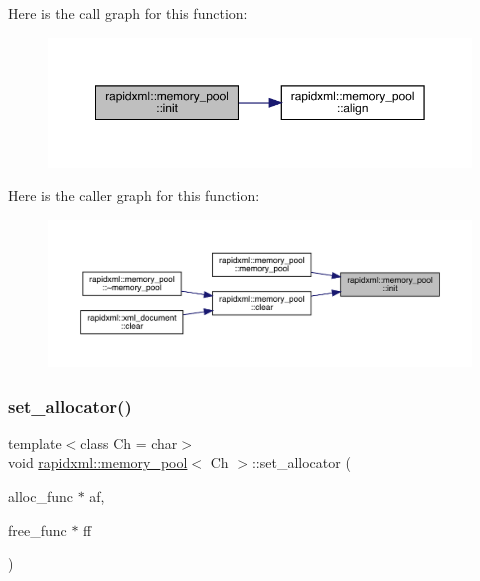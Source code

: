 Here is the call graph for this function\+:\nopagebreak
\begin{figure}[H]
\begin{center}
\leavevmode
\includegraphics[width=350pt]{classrapidxml_1_1memory__pool_a1076043ef092e327e59dd988c1ba82fb_cgraph}
\end{center}
\end{figure}
Here is the caller graph for this function\+:\nopagebreak
\begin{figure}[H]
\begin{center}
\leavevmode
\includegraphics[width=350pt]{classrapidxml_1_1memory__pool_a1076043ef092e327e59dd988c1ba82fb_icgraph}
\end{center}
\end{figure}
\mbox{\label{classrapidxml_1_1memory__pool_a84d3d8d2cdfc00501e1dcf26d889ae03}} 
\subsubsection{\texorpdfstring{set\_allocator()}{set\_allocator()}}
{\footnotesize\ttfamily template$<$class Ch  = char$>$ \\
void \mbox{\hyperlink{classrapidxml_1_1memory__pool}{rapidxml\+::memory\+\_\+pool}}$<$ Ch $>$\+::set\+\_\+allocator (\begin{DoxyParamCaption}\item[{alloc\+\_\+func $\ast$}]{af,  }\item[{free\+\_\+func $\ast$}]{ff }\end{DoxyParamCaption})\hspace{0.3cm}{\ttfamily [inline]}}

